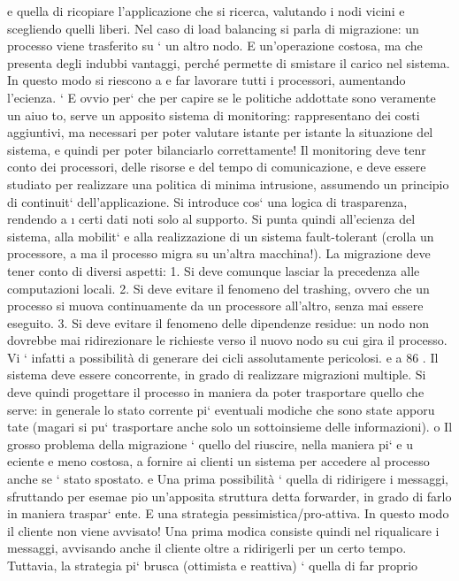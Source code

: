 \documentclass[a4paper,12pt]{article}
\begin{document}
e
quella di ricopiare l'applicazione che si ricerca, valutando i nodi vicini e
scegliendo quelli liberi.
Nel caso di load balancing si parla di migrazione: un processo viene trasferito su
`
un altro nodo. E un'operazione costosa, ma che presenta degli indubbi vantaggi,
perché permette di smistare il carico nel sistema. In questo modo si riescono a
e
far lavorare tutti i processori, aumentando l'ecienza.
`
E ovvio per` che per capire se le politiche addottate sono veramente un aiuo
to, serve un apposito sistema di monitoring: rappresentano dei costi aggiuntivi,
ma necessari per poter valutare istante per istante la situazione del sistema, e
quindi per poter bilanciarlo correttamente! Il monitoring deve tenr conto dei
processori, delle risorse e del tempo di comunicazione, e deve essere studiato per
realizzare una politica di minima intrusione, assumendo un principio di continuit` dell'applicazione. Si introduce cos`
una logica di trasparenza, rendendo
a
\i{}
certi dati noti solo al supporto. Si punta quindi all'ecienza del sistema, alla
mobilit` e alla realizzazione di un sistema fault-tolerant (crolla un processore,
a
ma il processo migra su un'altra macchina!).
La migrazione deve tener conto di diversi aspetti:
1. Si deve comunque lasciar la precedenza alle computazioni locali.
2. Si deve evitare il fenomeno del trashing, ovvero che un processo si muova
continuamente da un processore all'altro, senza mai essere eseguito.
3. Si deve evitare il fenomeno delle dipendenze residue: un nodo non dovrebbe
mai ridirezionare le richieste verso il nuovo nodo su cui gira il processo.
Vi ` infatti a possibilità di generare dei cicli assolutamente pericolosi.
e
a
86
. Il sistema deve essere concorrente, in grado di realizzare migrazioni multiple.
Si deve quindi progettare il processo in maniera da poter trasportare quello che
serve: in generale lo stato corrente pi` eventuali modiche che sono state apporu
tate (magari si pu` trasportare anche solo un sottoinsieme delle informazioni).
o
Il grosso problema della migrazione ` quello del riuscire, nella maniera pi`
e
u
eciente e meno costosa, a fornire ai clienti un sistema per accedere al processo
anche se ` stato spostato.
e
Una prima possibilità ` quella di ridirigere i messaggi, sfruttando per esemae
pio un'apposita struttura detta forwarder, in grado di farlo in maniera traspar`
ente. E una strategia pessimistica/pro-attiva. In questo modo il cliente non
viene avvisato! Una prima modica consiste quindi nel riqualicare i messaggi,
avvisando anche il cliente oltre a ridirigerli per un certo tempo.
Tuttavia, la strategia pi` brusca (ottimista e reattiva) ` quella di far proprio
\end{document}
